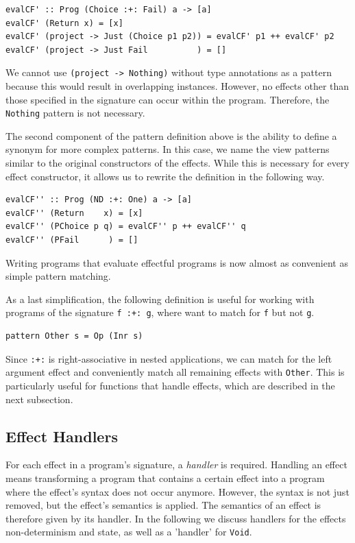 \documentclass[a4paper, 11pt, fleqn, twoside, abstract=on]{scrreprt}
\newcommand{\hinl}[1]{\texttt{#1}}
\begin{document}
\begin{verbatim}
evalCF' :: Prog (Choice :+: Fail) a -> [a]
evalCF' (Return x) = [x]
evalCF' (project -> Just (Choice p1 p2)) = evalCF' p1 ++ evalCF' p2
evalCF' (project -> Just Fail          ) = []
\end{verbatim}

We cannot use \hinl{(project -> Nothing)} without type annotations as a pattern because this would result in overlapping instances.
However, no effects other than those specified in the signature can occur within the program.
Therefore, the \hinl{Nothing} pattern is not necessary.

The second component of the pattern definition above is the ability to define a synonym for more complex patterns.
In this case, we name the view patterns similar to the original constructors of the effects.
While this is necessary for every effect constructor, it allows us to rewrite the definition in the following way.

\begin{verbatim}
evalCF'' :: Prog (ND :+: One) a -> [a]
evalCF'' (Return    x) = [x]
evalCF'' (PChoice p q) = evalCF'' p ++ evalCF'' q
evalCF'' (PFail      ) = []
\end{verbatim}

Writing programs that evaluate effectful programs is now almost as convenient as simple pattern matching.

As a last simplification, the following definition is useful for working with programs of the signature \hinl{f :+: g}, where want to match for \hinl{f} but not \hinl{g}.

\begin{verbatim}
pattern Other s = Op (Inr s)
\end{verbatim}

Since \hinl{:+:} is right-associative in nested applications, we can match for the left argument effect and conveniently match all remaining effects with \hinl{Other}.
This is particularly useful for functions that handle effects, which are described in the next subsection.


\subsection{Effect Handlers}
\label{subsec:effectHandlers}
For each effect in a program's signature, a \textit{handler} is required.
Handling an effect means transforming a program that contains a certain effect into a program where the effect's syntax does not occur anymore.
However, the syntax is not just removed, but the effect's semantics is applied.
The semantics of an effect is therefore given by its handler.
In the following we discuss handlers for the effects non-determinism and state, as well as a 'handler' for \hinl{Void}.
\end{document}
